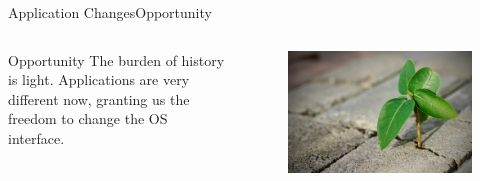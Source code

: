 \documentclass[10pt]{beamer}
\begin{document}
\begin{frame}{Application Changes}{Opportunity}
  \begin{columns}[T] %
    \begin{column}{.5\textwidth}
      \begin{block}{Opportunity}
        The burden of history is light. Applications are very different now,
        granting us the freedom to change the OS interface.
      \end{block}
    \end{column}

    \hfill
    \begin{column}{.4\textwidth}
      \begin{figure}[ht]
        \includegraphics[width=1\textwidth, keepaspectratio=true]{images/opportunity.png}
      \end{figure}
    \end{column}
  \end{columns}

\end{frame}

\end{document}

